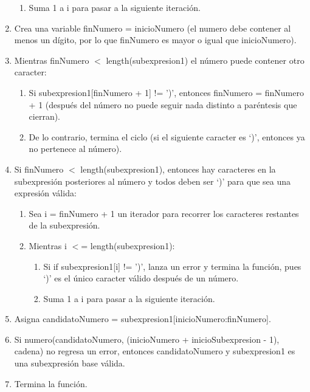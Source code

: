 \documentclass{article}
\begin{document}
\begin{enumerate}
\begin{enumerate}
        \item Suma 1 a i para pasar a la siguiente iteración.
    \end{enumerate}
    \item Crea una variable finNumero = inicioNumero  (el numero debe contener al menos un dígito, por lo que finNumero es mayor o igual que inicioNumero).
    \item Mientras finNumero $<$ length(subexpresion1) el número puede contener otro caracter:
    \begin{enumerate}
        \item Si subexpresion1[finNumero + 1] != ')', entonces finNumero = finNumero + 1 (después del número no puede seguir nada distinto a paréntesis que cierran).
        \item De lo contrario, termina el ciclo (si el siguiente caracter es ‘)’, entonces ya no pertenece al número).
    \end{enumerate}
    \item Si finNumero $<$ length(subexpresion1), entonces hay caracteres en la subexpresión posteriores al número y todos deben ser ‘)’ para que sea una expresión válida:
    \begin{enumerate}
        \item Sea i = finNumero  + 1 un iterador para recorrer los caracteres restantes de la subexpresión.
        \item Mientras i $<$=  length(subexpresion1):
        \begin{enumerate}
            \item Si if subexpresion1[i] != ')', lanza un error y termina la función, pues ‘)’ es el único caracter válido después de un número.
            \item Suma 1 a i para pasar a la siguiente iteración.
        \end{enumerate}
    \end{enumerate}
    \item Asigna candidatoNumero = subexpresion1[inicioNumero:finNumero].
    \item Si numero(candidatoNumero, (inicioNumero + inicioSubexpresion  - 1), cadena) no regresa un error, entonces candidatoNumero y subexpresion1  es una subexpresión base válida.
    \item Termina la función.
\end{enumerate}
\end{document}
